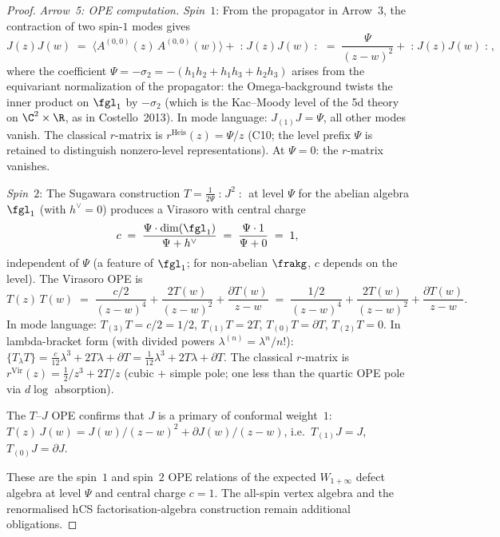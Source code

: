 \begin{proof}
\emph{Arrow~5: OPE computation.}
\emph{Spin~$1$}: From the propagator in Arrow~3, the contraction of two spin-$1$ modes gives
\[
 J(z) J(w) \;=\; \langle A^{(0,0)}(z)\, A^{(0,0)}(w) \rangle + \mathopen{:}J(z) J(w)\mathclose{:}
 \;=\; \frac{\Psi}{(z - w)^2} + \mathopen{:}J(z) J(w)\mathclose{:},
\]
where the coefficient $\Psi = -\sigma_2 = -(h_1 h_2 + h_1 h_3 + h_2 h_3)$ arises from the equivariant normalization of the propagator: the Omega-background twists the inner product on $\fgl_1$ by $-\sigma_2$ (which is the Kac--Moody level of the 5d theory on $\C^2 \times \R$, as in Costello~2013). In mode language: $J_{(1)} J = \Psi$, all other modes vanish. The classical $r$-matrix is $r^{\mathrm{Heis}}(z) = \Psi/z$ (C10; the level prefix $\Psi$ is retained to distinguish nonzero-level representations). At $\Psi = 0$: the $r$-matrix vanishes.

\emph{Spin~$2$}: The Sugawara construction $T = \frac{1}{2\Psi}\mathopen{:}J^2\mathclose{:}$ at level $\Psi$ for the abelian algebra $\fgl_1$ (with $h^\vee = 0$) produces a Virasoro with central charge
\[
 c \;=\; \frac{\Psi \cdot \dim(\fgl_1)}{\Psi + h^\vee} \;=\; \frac{\Psi \cdot 1}{\Psi + 0} \;=\; 1,
\]
independent of $\Psi$ (a feature of $\fgl_1$; for non-abelian $\frakg$, $c$ depends on the level). The Virasoro OPE is
\[
 T(z)\,T(w) \;=\; \frac{c/2}{(z - w)^4} + \frac{2T(w)}{(z - w)^2} + \frac{\partial T(w)}{z - w}
 \;=\; \frac{1/2}{(z - w)^4} + \frac{2T(w)}{(z - w)^2} + \frac{\partial T(w)}{z - w}.
\]
In mode language: $T_{(3)} T = c/2 = 1/2$, $T_{(1)} T = 2T$, $T_{(0)} T = \partial T$, $T_{(2)} T = 0$. In lambda-bracket form (with divided powers $\lambda^{(n)} = \lambda^n/n!$): $\{T_\lambda T\} = \tfrac{c}{12}\lambda^3 + 2T\lambda + \partial T = \tfrac{1}{12}\lambda^3 + 2T\lambda + \partial T$. The classical $r$-matrix is $r^{\mathrm{Vir}}(z) = \tfrac{1}{2}/z^3 + 2T/z$ (cubic $+$ simple pole; one less than the quartic OPE pole via $d\log$ absorption).

The $T$--$J$ OPE confirms that $J$ is a primary of conformal weight~$1$: $T(z)\,J(w) = J(w)/(z - w)^2 + \partial J(w)/(z - w)$, i.e.\ $T_{(1)}J = J$, $T_{(0)}J = \partial J$.

These are the spin~$1$ and spin~$2$ OPE relations of the expected
$W_{1+\infty}$ defect algebra at level $\Psi$ and central charge
$c = 1$. The all-spin vertex algebra and the renormalised hCS
factorisation-algebra construction remain additional obligations.
\end{proof}

